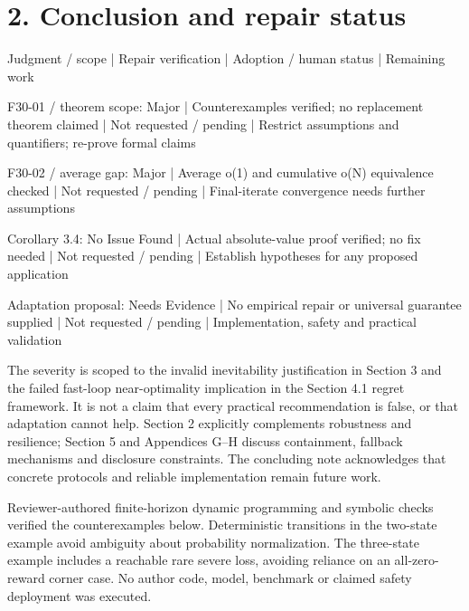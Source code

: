 \documentclass[10pt]{article}
\begin{document}
\section*{2. Conclusion and repair status}
Judgment / scope | Repair verification | Adoption / human status | Remaining work\par
F30-01 / theorem scope: Major | Counterexamples verified; no replacement theorem claimed | Not requested / pending | Restrict assumptions and quantifiers; re-prove formal claims\par
F30-02 / average gap: Major | Average o(1) and cumulative o(N) equivalence checked | Not requested / pending | Final-iterate convergence needs further assumptions\par
Corollary 3.4: No Issue Found | Actual absolute-value proof verified; no fix needed | Not requested / pending | Establish hypotheses for any proposed application\par
Adaptation proposal: Needs Evidence | No empirical repair or universal guarantee supplied | Not requested / pending | Implementation, safety and practical validation\par
The severity is scoped to the invalid inevitability justification in Section 3 and the failed fast-loop near-optimality implication in the Section 4.1 regret framework. It is not a claim that every practical recommendation is false, or that adaptation cannot help. Section 2 explicitly complements robustness and resilience; Section 5 and Appendices G–H discuss containment, fallback mechanisms and disclosure constraints. The concluding note acknowledges that concrete protocols and reliable implementation remain future work.\par
Reviewer-authored finite-horizon dynamic programming and symbolic checks verified the counterexamples below. Deterministic transitions in the two-state example avoid ambiguity about probability normalization. The three-state example includes a reachable rare severe loss, avoiding reliance on an all-zero-reward corner case. No author code, model, benchmark or claimed safety deployment was executed.\par
\end{document}
